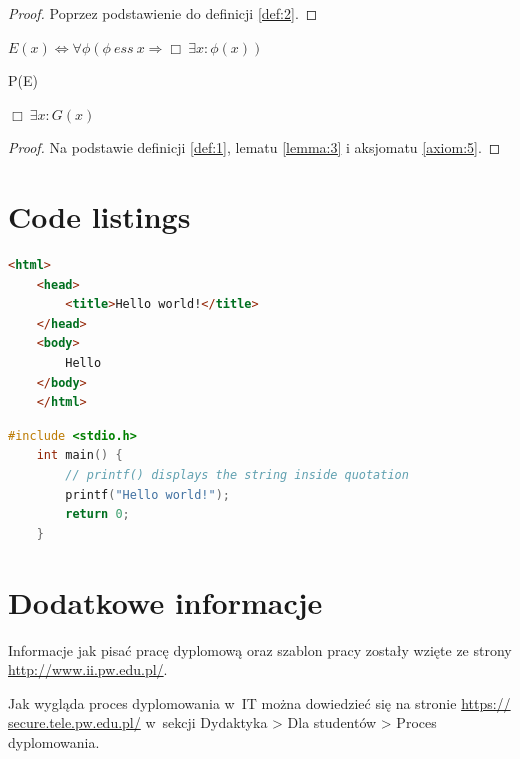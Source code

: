 \documentclass[
    left=2.5cm,         %
    right=2.5cm,        %
    top=2.5cm,          %
    bottom=3cm,         %
    bindingoffset=6mm,  %
    nohyphenation=true %
]{eiti/eiti-thesis} %
\begin{document}
\begin{proof}
	Poprzez podstawienie do definicji \ref{def:2}. 
\end{proof}
\begin{definition} \label{def:3}
	$ E(x) \Leftrightarrow \forall \phi \left( \phi \ ess \ x \Rightarrow \Box\ \exists x: \phi(x) \right) $
\end{definition}
\begin{axiom} \label{axiom:5}
	P(E)
\end{axiom}
\begin{theorem}
	$ \Box\ \exists x : G(x) $
\end{theorem}
\begin{proof}
	Na podstawie definicji \ref{def:1}, lematu \ref{lemma:3} i aksjomatu \ref{axiom:5}. 
\end{proof}


\section{Code listings}
\lipsum[10]

\begin{lstlisting}[language=HTML]
	<html>
	<head>
		<title>Hello world!</title>
	</head>
	<body>
		Hello
	</body>
	</html>
\end{lstlisting}

\lipsum[11]

\begin{lstlisting}[language=C]
	#include <stdio.h>
	int main() {
		// printf() displays the string inside quotation
		printf("Hello world!");
		return 0;
	}
\end{lstlisting}

\lipsum[12]


\section{Dodatkowe informacje}
Informacje jak pisać pracę dyplomową oraz szablon pracy zostały wzięte ze strony \href{http://www.ii.pw.edu.pl/ii_pol/Instytut-Informatyki/Nauczanie/Poradnik-dyplomanta/Przygotowanie-pracy-dyplomowej}{http://www.ii.pw.edu.pl/}.

Jak wygląda proces dyplomowania w~IT można dowiedzieć się na stronie \href{https://secure.tele.pw.edu.pl/wp-content/uploads/2017/06/PROCES-DYPLOMOWANIA-17L.pdf}{https:// secure.tele.pw.edu.pl/} w~sekcji Dydaktyka > Dla studentów > Proces dyplomowania.
\end{document}
